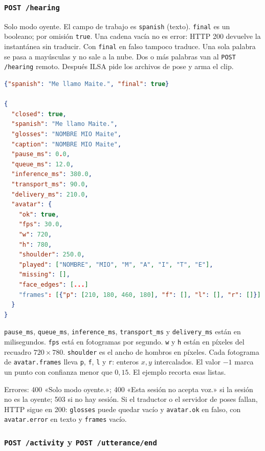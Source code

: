\subsubsection{\texttt{POST /hearing}}

Solo modo oyente. El campo de trabajo es \texttt{spanish} (texto). \texttt{final} es un booleano; por omisión \texttt{true}. Una cadena vacía no es error: HTTP 200 devuelve la instantánea sin traducir. Con \texttt{final} en falso tampoco traduce. Una sola palabra se pasa a mayúsculas y no sale a la nube. Dos o más palabras van al \texttt{POST /hearing} remoto. Después ILSA pide los archivos de pose y arma el clip.

\begin{lstlisting}[language=json]
{"spanish": "Me llamo Maite.", "final": true}

{
  "closed": true,
  "spanish": "Me llamo Maite.",
  "glosses": "NOMBRE MIO Maite",
  "caption": "NOMBRE MIO Maite",
  "pause_ms": 0.0,
  "queue_ms": 12.0,
  "inference_ms": 380.0,
  "transport_ms": 90.0,
  "delivery_ms": 210.0,
  "avatar": {
    "ok": true,
    "fps": 30.0,
    "w": 720,
    "h": 780,
    "shoulder": 250.0,
    "played": ["NOMBRE", "MIO", "M", "A", "I", "T", "E"],
    "missing": [],
    "face_edges": [...]
    "frames": [{"p": [210, 180, 460, 180], "f": [], "l": [], "r": []}]
  }
}
\end{lstlisting}

\texttt{pause\_ms}, \texttt{queue\_ms}, \texttt{inference\_ms}, \texttt{transport\_ms} y \texttt{delivery\_ms} están en milisegundos. \texttt{fps} está en fotogramas por segundo. \texttt{w} y \texttt{h} están en píxeles del recuadro $720 \times 780$. \texttt{shoulder} es el ancho de hombros en píxeles. Cada fotograma de \texttt{avatar.frames} lleva \texttt{p}, \texttt{f}, \texttt{l} y \texttt{r}: enteros $x, y$ intercalados. El valor $-1$ marca un punto con confianza menor que $0{,}15$. El ejemplo recorta esas listas.

Errores: 400 «Solo modo oyente.»; 400 «Esta sesión no acepta voz.» si la sesión no es la oyente; 503 si no hay sesión. Si el traductor o el servidor de poses fallan, HTTP sigue en 200: \texttt{glosses} puede quedar vacío y \texttt{avatar.ok} en falso, con \texttt{avatar.error} en texto y \texttt{frames} vacío.

\subsubsection{\texttt{POST /activity} y \texttt{POST /utterance/end}}

